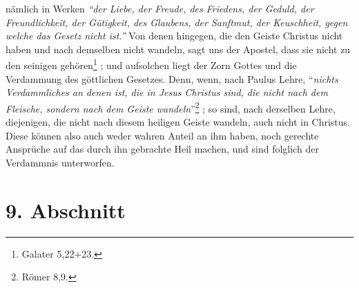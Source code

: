 nämlich in Werken
\textit{"`der Liebe, der Freude, des Friedens, der Geduld, der
Freundlichkeit, der Gütigkeit, des Glaubens, der Sanftmut, der Keuschheit,
gegen welche das Gesetz nicht ist."'}
Von denen hingegen, die den Geiste Christus nicht haben und nach demselben nicht
wandeln, sagt uns der Apostel, dass sie nicht zu den seinigen
gehören\footnote{Galater 5,22+23.}
;
und aufsolchen liegt der Zorn Gottes
und die Verdammung des göttlichen Gesetzes. 
Denn, wenn, nach Paulus Lehre, "`\textit{nichts Verdammliches an denen ist, die
in Jesus Christus sind, die nicht nach dem Fleische, sondern nach dem Geiste
wandeln}"'\footnote{Römer 8,9.} ;
so sind, nach derselben Lehre, diejenigen, die nicht nach diesem heiligen Geiste
wandeln, auch nicht in Christus.
Diese können also auch weder wahren Anteil an ihm haben, noch gerechte
Ansprüche auf das durch ihn gebrachte Heil machen, und sind folglich der
Verdammnis unterworfen. 

\section{9. Abschnitt} \label{kap1_ab9}

